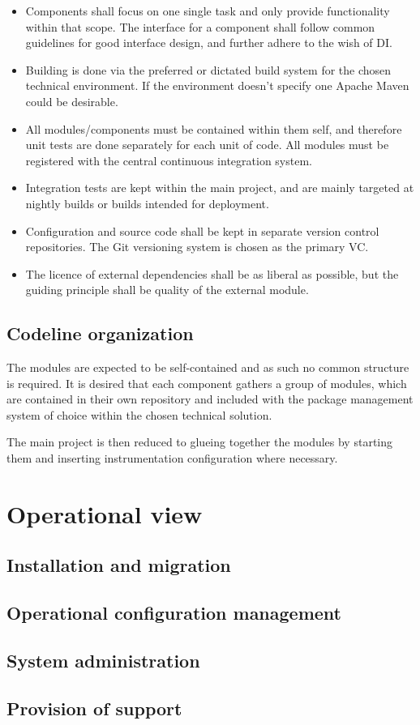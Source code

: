 \begin{itemize}
    \item Components shall focus on one single task and only provide
        functionality within that scope. The interface for a component shall
        follow common guidelines for good interface design, and further adhere
        to the wish of DI.
    \item Building is done via the preferred or dictated build system for the
        chosen technical environment. If the environment doesn't specify one
        Apache Maven could be desirable.
    \item All modules/components must be contained within them self, and
        therefore unit tests are done separately for each unit of code. All
        modules must be registered with the central continuous integration
        system.
    \item Integration tests are kept within the main project, and are mainly
        targeted at nightly builds or builds intended for deployment.
    \item Configuration and source code shall be kept in separate version
        control repositories. The Git versioning system is chosen as the
        primary VC.
    \item The licence of external dependencies shall be as liberal as possible,
        but the guiding principle shall be quality of the external module.
\end{itemize}


\subsection{Codeline organization}
\label{sec:codel-organ}
The modules are expected to be self-contained and as such no common structure
is required. It is desired that each component gathers a group of modules,
which are contained in their own repository and included with the package
management system of choice within the chosen technical solution.

The main project is then reduced to glueing together the modules by starting
them and inserting instrumentation configuration where necessary. 

\section{Operational view}
\label{sec:operational-view}

\subsection{Installation and migration}
\label{sec:inst-migr}


\subsection{Operational configuration management}
\label{sec:oper-conf-manag}


\subsection{System administration}
\label{sec:syst-admin}


\subsection{Provision of support}
\label{sec:provision-support}
